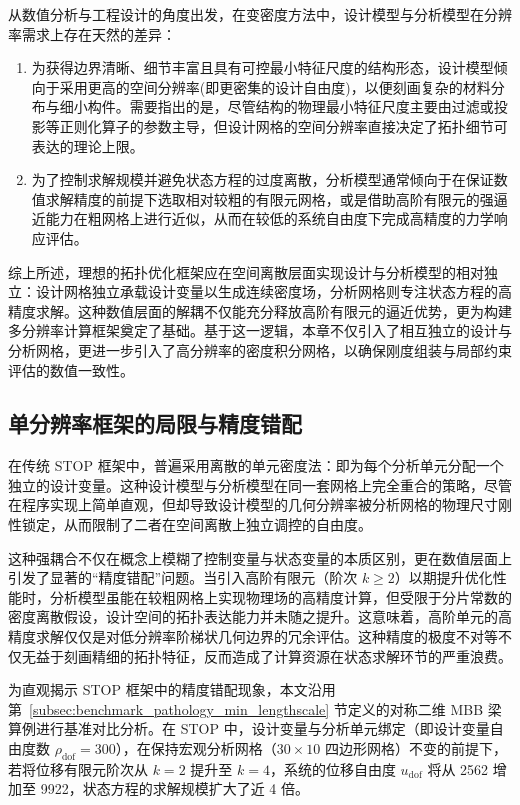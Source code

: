 从数值分析与工程设计的角度出发，在变密度方法中，设计模型与分析模型在分辨率需求上存在天然的差异：
\begin{enumerate}[
	label={（\arabic*）},
	labelsep=0.25em,
	leftmargin=3.2em,
	itemsep=0.4em,
	topsep=0.4em,
	parsep=0pt,
	partopsep=0pt
	]
	\item 为获得边界清晰、细节丰富且具有可控最小特征尺度的结构形态，设计模型倾向于采用更高的空间分辨率(即更密集的设计自由度)，以便刻画复杂的材料分布与细小构件。需要指出的是，尽管结构的物理最小特征尺度主要由过滤或投影等正则化算子的参数主导，但设计网格的空间分辨率直接决定了拓扑细节可表达的理论上限。
	
	\item 为了控制求解规模并避免状态方程的过度离散，分析模型通常倾向于在保证数值求解精度的前提下选取相对较粗的有限元网格，或是借助高阶有限元的强逼近能力在粗网格上进行近似，从而在较低的系统自由度下完成高精度的力学响应评估。
\end{enumerate}

综上所述，理想的拓扑优化框架应在空间离散层面实现设计与分析模型的相对独立：设计网格独立承载设计变量以生成连续密度场，分析网格则专注状态方程的高精度求解。这种数值层面的解耦不仅能充分释放高阶有限元的逼近优势，更为构建多分辨率计算框架奠定了基础。基于这一逻辑，本章不仅引入了相互独立的设计与分析网格，更进一步引入了高分辨率的密度积分网格，以确保刚度组装与局部约束评估的数值一致性。


\subsection{单分辨率框架的局限与精度错配}
\label{subsec:single_resolution_mismatch}

在传统 STOP 框架中，普遍采用离散的单元密度法：即为每个分析单元分配一个独立的设计变量。这种设计模型与分析模型在同一套网格上完全重合的策略，尽管在程序实现上简单直观，但却导致设计模型的几何分辨率被分析网格的物理尺寸刚性锁定，从而限制了二者在空间离散上独立调控的自由度。

这种强耦合不仅在概念上模糊了控制变量与状态变量的本质区别，更在数值层面上引发了显著的“精度错配”问题。当引入高阶有限元（阶次 $k \ge 2$）以期提升优化性能时，分析模型虽能在较粗网格上实现物理场的高精度计算，但受限于分片常数的密度离散假设，设计空间的拓扑表达能力并未随之提升。这意味着，高阶单元的高精度求解仅仅是对低分辨率阶梯状几何边界的冗余评估。这种精度的极度不对等不仅无益于刻画精细的拓扑特征，反而造成了计算资源在状态求解环节的严重浪费。

为直观揭示 STOP 框架中的精度错配现象，本文沿用第~\ref{subsec:benchmark_pathology_min_lengthscale} 节定义的对称二维 MBB 梁算例进行基准对比分析。在 STOP 中，设计变量与分析单元绑定（即设计变量自由度数 $\rho_{\text{dof}}=300$），在保持宏观分析网格（$30\times10$ 四边形网格）不变的前提下，若将位移有限元阶次从 $k=2$ 提升至 $k=4$，系统的位移自由度 $u_{\text{dof}}$ 将从 2562 增加至 9922，状态方程的求解规模扩大了近 4 倍。

